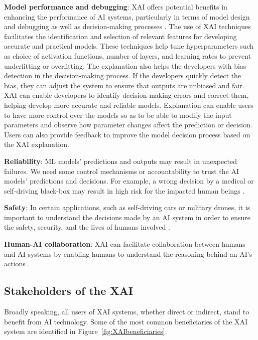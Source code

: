 \documentclass[final,5p,times,twocolumn]{elsarticle}
\begin{document}
\textbf{Model performance and debugging}:
XAI offers potential benefits in enhancing the performance of AI systems, particularly in terms of model design and debugging as well as decision-making processes \cite{samek2017explainable,zhang2018interpretable, samek2019explainable}. The use of XAI techniques facilitates the identification and selection of relevant features for developing accurate and practical models. These techniques help tune hyperparameters such as	choice of activation functions, number of layers, and learning rates to prevent underfitting or overfitting. The explanation also helps the developers with bias detection in the decision-making process. If the developers quickly detect the bias, they can adjust the system to ensure that outputs are unbiased and fair. XAI can enable developers to identify decision-making errors and correct them, helping develop more accurate and reliable models. Explanation can enable users to have more control over the models so as to be able to modify the input parameters and observe how parameter changes affect the prediction or decision. Users can also provide feedback to improve the model decision process based on the XAI explanation.



\textbf{Reliability}: ML models' predictions and outputs may result in unexpected failures. We need some control mechanisms or accountability to trust the	AI models' predictions and decisions. For example, a wrong decision by a medical or self-driving black-box may result in high risk for the impacted human beings \cite{doran2017does,zhang2021survey}.

\textbf{Safety}: In certain applications, such as self-driving cars or military drones, it is important to understand the decisions made by an AI system in order to ensure the safety, security, and the lives of humans involved \cite{amodei2016concrete}.

\textbf{Human-AI collaboration}: XAI can facilitate collaboration between humans and AI systems by enabling humans to understand the reasoning behind an AI's actions \cite{dietvorst2015algorithm}.
 

\subsection{Stakeholders of the XAI}
Broadly speaking, all users of XAI systems, whether direct or indirect, stand to benefit from AI technology. Some of the most common beneficiaries of the XAI system are identified in Figure~\ref{fig:XAIbeneficiaries}.
\end{document}
